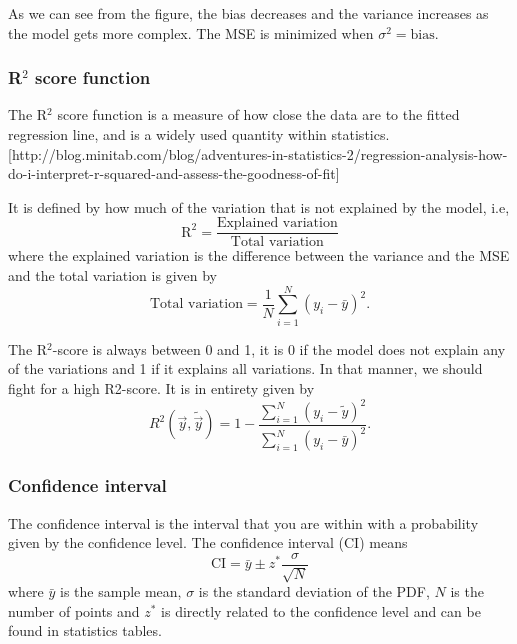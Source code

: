 As we can see from the figure, the bias decreases and the variance increases as the model gets more complex. The MSE is minimized when $\sigma^2=\text{bias}$. 

\subsubsection{R$^2$ score function} \label{sec:R2}
The R$^2$ score function is a measure of how close the data are to the fitted regression line, and is a widely used quantity within statistics. [http://blog.minitab.com/blog/adventures-in-statistics-2/regression-analysis-how-do-i-interpret-r-squared-and-assess-the-goodness-of-fit]

It is defined by how much of the variation that is not explained by the model, i.e, 
\begin{equation*}
\text{R}^2=\frac{\text{Explained variation}}{\text{Total variation}}
\end{equation*}
where the explained variation is the difference between the variance and the MSE and the total variation is given by
\begin{equation*}
\text{Total variation}=\frac{1}{N}\sum_{i=1}^N(y_i-\bar{y})^2.
\end{equation*}

The R$^2$-score is always between 0 and 1, it is 0 if the model does not explain any of the variations and 1 if it explains all variations. In that manner, we should fight for a high R2-score. It is in entirety given by
\begin{equation}
R^2(\vec{y},\tilde{\vec{y}})=1-\frac{\sum_{i=1}^N(y_i-\tilde{y})^2}{\sum_{i=1}^N(y_i-\bar{y})^2}.
\end{equation}

\subsubsection{Confidence interval} \label{sec:confidence}
The confidence interval is the interval that you are within with a probability given by the confidence level. The confidence interval (CI) means
\begin{equation}
\text{CI}=\bar{y}\pm z^*\frac{\sigma}{\sqrt{N}}
\end{equation}
where $\bar{y}$ is the sample mean, $\sigma$ is the standard deviation of the PDF, $N$ is the number of points and $z^*$ is directly related to the confidence level and can be found in statistics tables. 

